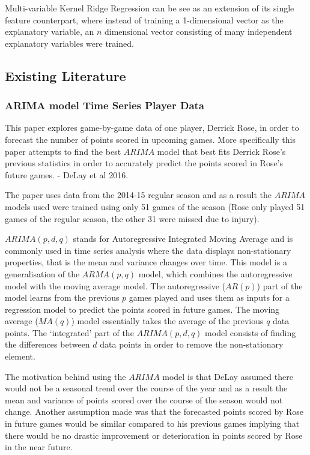 \documentclass[a4paper,11pt,twoside]{article}
\begin{document}
Multi-variable Kernel Ridge Regression can be see as an extension of its single feature counterpart, where instead of training a 1-dimensional vector as the explanatory variable, an $n$ dimensional vector consisting of many independent explanatory variables were trained.

\subsection{Existing Literature}
 
\subsubsection{ARIMA model Time Series Player Data}

This paper explores game-by-game data of one player, Derrick Rose, in order to forecast the number of points scored in upcoming games. More specifically this paper attempts to find the best $ARIMA$ model that best fits Derrick Rose's previous statistics in order to accurately predict the points scored in Rose's future games. - DeLay et al 2016.

The paper uses data from the 2014-15 regular season and as a result the $ARIMA$ models used  were trained using only 51 games of the season (Rose only played 51 games of the regular season, the other 31 were missed due to injury).

$ARIMA(p,d,q)$ stands for Autoregressive Integrated Moving Average and is commonly used in time series analysis where the data displays non-stationary properties, that is the mean and variance changes over time. This model is a generalisation of the $ARMA(p,q)$ model, which combines the autoregressive model with the moving average model. The autoregressive ($AR(p)$) part of the model learns from the previous $p$ games played and uses them as inputs for a regression model to predict the points scored in future games. The moving average ($MA(q)$) model essentially takes the average of the previous $q$ data points. The `integrated' part of the $ARIMA(p,d,q)$ model consists of finding the differences between $d$ data points in order to remove the non-stationary element.

The motivation behind using the $ARIMA$ model is that DeLay assumed there would not be a seasonal trend over the course of the year and as a result the mean and variance of points scored over the course of the season would not change. Another assumption made was that the forecasted points scored by Rose in future games would be similar compared to his previous games implying that there would be no drastic improvement or deterioration in points scored by Rose in the near future.
\end{document}
